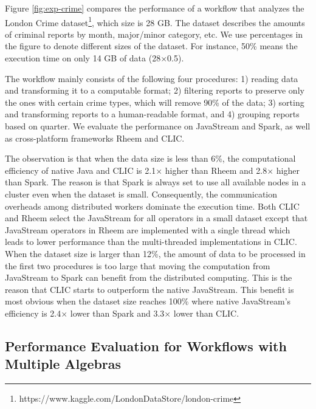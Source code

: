 Figure \ref{fig:exp-crime} compares the performance of a workflow that analyzes the London Crime dataset\footnote{https://www.kaggle.com/LondonDataStore/london-crime}, which size is 28 GB. The dataset describes the amounts of criminal reports by month, major/minor category, etc. We use percentages in the figure to denote different sizes of the dataset. For instance, 50\% means the execution time on only 14 GB of data (28$\times$0.5).

The workflow mainly consists of the following four procedures: 1) reading data and transforming it to a computable format; 2) filtering reports to preserve only the ones with certain crime types, which will remove 90\% of the data; 3) sorting and transforming reports to a human-readable format, and 4) grouping reports based on quarter. We evaluate the performance on JavaStream and Spark, as well as cross-platform frameworks Rheem and CLIC. 

The observation is that when the data size is less than 6\%, the computational efficiency of native Java and CLIC is 2.1$\times$ higher than Rheem and 2.8$\times$ higher than Spark. The reason is that Spark is always set to use all available nodes in a cluster even when the dataset is small. Consequently, the communication overheads among distributed workers dominate the execution time. Both CLIC and Rheem select the JavaStream for all operators in a small dataset except that JavaStream operators in Rheem are implemented with a single thread which leads to lower performance than the multi-threaded implementations in CLIC. When the dataset size is larger than 12\%, the amount of data to be processed in the first two procedures is too large that moving 
the computation from JavaStream to Spark can benefit from the distributed computing. This is the reason that CLIC starts to outperform the native JavaStream. This benefit is most obvious when the dataset size reaches 100\% where native JavaStream's efficiency is 2.4$\times$ lower than Spark and 3.3$\times$ lower than CLIC. %


\subsection{Performance Evaluation for Workflows with Multiple Algebras}

